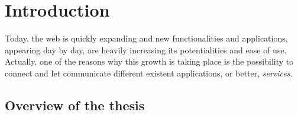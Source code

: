 \section{Introduction}
Today, the web is quickly expanding and new functionalities and applications, appearing day by day, are heavily increasing its potentialities and ease of use. Actually, one of the reasons why this growth is taking place is the possibility to connect and let communicate different existent applications, or better, \textit{services}.


 




\subsection{Overview of the thesis}
